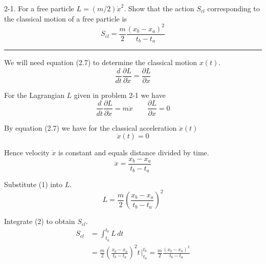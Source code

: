 \documentclass[12pt]{article}
\begin{document}
2-1.
For a free particle $L=(m/2)\dot x^2.$
Show that the action $S_{cl}$ corresponding to the classical motion
of a free particle is
\begin{equation*}
S_{cl}=\frac{m}{2}\frac{(x_b-x_a)^2}{t_b-t_a}
\tag{2.8}
\end{equation*}

\bigskip
\hrule

\bigskip
We will need equation (2.7) to determine the classical motion $x(t)$.
\begin{equation*}
\frac{d}{dt}\frac{\partial L}{\partial\dot x}=\frac{\partial L}{\partial x}
\tag{2.7}
\end{equation*}

For the Lagrangian $L$ given in problem 2-1 we have
\begin{equation*}
\frac{d}{dt}\frac{\partial L}{\partial\dot x}=m\ddot x
\qquad
\frac{\partial L}{\partial x}=0
\end{equation*}

By equation (2.7) we have for the classical acceleration $\ddot x(t)$
\begin{equation*}
\ddot x(t)=0
\end{equation*}

Hence velocity $\dot x$ is constant and equals distance divided by time.
\begin{equation*}
\dot x=\frac{x_b-x_a}{t_b-t_a}
\tag{1}
\end{equation*}

Substitute (1) into $L$.
\begin{equation*}
L=\frac{m}{2}\left(\frac{x_b-x_a}{t_b-t_a}\right)^2
\tag{2}
\end{equation*}

Integrate (2) to obtain $S_{cl}$.
\begin{align*}
S_{cl}
&=\int_{t_a}^{t_b}L\,dt
\\
&=\frac{m}{2}\left(\frac{x_b-x_a}{t_b-t_a}\right)^2 t\,\bigg|_{t_a}^{t_b}
=\frac{m}{2}\frac{(x_b-x_a)^2}{t_b-t_a}
\end{align*}
\end{document}
